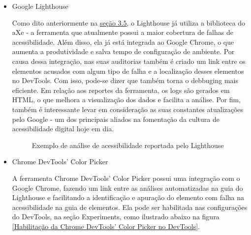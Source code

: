 \documentclass[
	12pt,				%
	openright,			%
	oneside,			%
	a4paper,			%
	chapter=TITLE,		%
	section=TITLE,		%
	subsection=TITLE,	%
	subsubsection=TITLE,%
	english,			%
	brazil				%
	]{abntex2}
\theoremstyle{definition}
\begin{document}
\begin{itemize}

    \item Google Lighthouse
    
Como dito anteriormente na \hyperref[sec:ferramentas]{seção 3.5}, o Lighthouse já utiliza a biblioteca do aXe - a ferramenta que atualmente possui a maior cobertura de falhas de acessibilidade. Além disso, ela já está integrada ao Google Chrome, o que aumenta a produtividade e salva tempo de configuração de ambiente. Por causa dessa integração, nas suas auditorias também é criado um link entre os elementos acusados com algum tipo de falha e a localização desses elementos no DevTools. Com isso, pode-se dizer que também torna o debbuging mais eficiente. Em relação aos reportes da ferramenta, os logs são gerados em HTML, o que melhora a visualização dos dados e facilita a análise. Por fim, também é interessante levar em consideração as suas constantes atualizações pelo Google - um dos principais aliados na fomentação da cultura de acessibilidade digital hoje em dia.


\begin{figure}[!h]
\centering
\caption{Exemplo de análise de acessibilidade reportada pelo Lighthouse}
\label{Exemplo de análise de acessibilidade reportada pelo Lighthouse}
\end{figure}

\pagebreak
    
    \item Chrome DevTools’ Color Picker
    
A ferramenta Chrome DevTools’ Color Picker possui uma integração com o Google Chrome, fazendo um link entre as análises automatizadas na guia do Lighthouse e facilitando a identificação e apuração do elemento com falha na acessibilidade na guia de elementos. Ela pode ser habilitada nas configurações do DevTools, na seção Experiments, como ilustrado abaixo na figura \ref{Habilitação da Chrome DevTools’ Color Picker no DevTools}.


\end{itemize}
\end{document}
